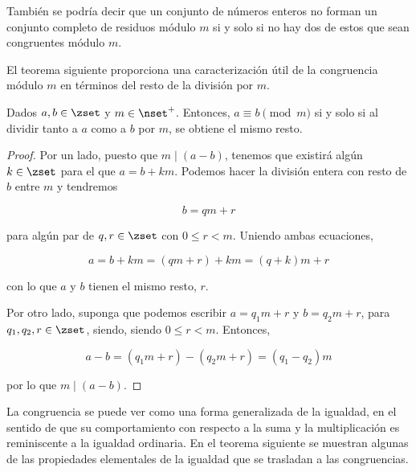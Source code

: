 También se podría decir que un conjunto de números enteros no forman un
conjunto completo de residuos módulo $m$ si y solo si no hay dos de estos
que sean congruentes módulo $m$.

El teorema siguiente proporciona una caracterización útil de la congruencia
módulo $m$ en términos del resto de la división por $m$.

\begin{theorem}
  Dados $a, b \in \zset$ y $m \in \nset^{+}$. Entonces, $a \equiv b \pmod m$
  si y solo si al dividir tanto a $a$ como a $b$ por $m$, se obtiene el
  mismo resto.
\end{theorem}

\begin{proof}
  Por un lado, puesto que $m \mid (a - b)$, tenemos que existirá algún $k
  \in \zset$ para el que $a = b + km$. Podemos hacer la división entera con
  resto de $b$ entre $m$ y tendremos

  $$ b = qm + r $$

  \noindent para algún par de $q, r \in \zset$ con $0 \leq r < m$. Uniendo
  ambas ecuaciones,

  $$ a = b + km = (qm + r) + km = (q + k)m + r $$

  \noindent con lo que $a$ y $b$ tienen el mismo resto, $r$.

  Por otro lado, suponga que podemos escribir $a = q_1 m + r$ y $b = q_2 m +
  r$, para $q_1, q_2, r \in \zset$, siendo, siendo $0 \leq r < m$. Entonces,

  $$ a - b = (q_1 m + r) - (q_2 m + r) = (q_1 - q_2)m $$

  \noindent por lo que $m \mid (a - b)$.
\end{proof}

La congruencia se puede ver como una forma generalizada de la igualdad, en
el sentido de que su comportamiento con respecto a la suma y la
multiplicación es reminiscente a la igualdad ordinaria. En el teorema
siguiente se muestran algunas de las propiedades elementales de la igualdad
que se trasladan a las congruencias.

